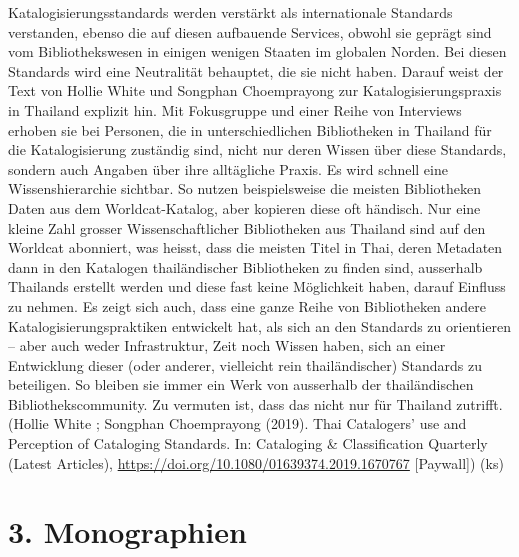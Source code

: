 \documentclass[a4paper,
fontsize=11pt,
oneside,
numbers=noperiodatend,
parskip=half-,
bibliography=totoc,
final
]{scrartcl}
\begin{document}
Katalogisierungsstandards werden verstärkt als internationale Standards
verstanden, ebenso die auf diesen aufbauende Services, obwohl sie
geprägt sind vom Bibliothekswesen in einigen wenigen Staaten im globalen
Norden. Bei diesen Standards wird eine Neutralität behauptet, die sie
nicht haben. Darauf weist der Text von Hollie White und Songphan
Choemprayong zur Katalogisierungspraxis in Thailand explizit hin. Mit
Fokusgruppe und einer Reihe von Interviews erhoben sie bei Personen, die
in unterschiedlichen Bibliotheken in Thailand für die Katalogisierung
zuständig sind, nicht nur deren Wissen über diese Standards, sondern
auch Angaben über ihre alltägliche Praxis. Es wird schnell eine
Wissenshierarchie sichtbar. So nutzen beispielsweise die meisten
Bibliotheken Daten aus dem Worldcat-Katalog, aber kopieren diese oft
händisch. Nur eine kleine Zahl grosser Wissenschaftlicher Bibliotheken
aus Thailand sind auf den Worldcat abonniert, was heisst, dass die
meisten Titel in Thai, deren Metadaten dann in den Katalogen
thailändischer Bibliotheken zu finden sind, ausserhalb Thailands
erstellt werden und diese fast keine Möglichkeit haben, darauf Einfluss
zu nehmen. Es zeigt sich auch, dass eine ganze Reihe von Bibliotheken
andere Katalogisierungspraktiken entwickelt hat, als sich an den
Standards zu orientieren -- aber auch weder Infrastruktur, Zeit noch
Wissen haben, sich an einer Entwicklung dieser (oder anderer, vielleicht
rein thailändischer) Standards zu beteiligen. So bleiben sie immer ein
Werk von ausserhalb der thailändischen Bibliothekscommunity. Zu vermuten
ist, dass das nicht nur für Thailand zutrifft. (Hollie White ; Songphan
Choemprayong (2019). Thai Catalogers' use and Perception of Cataloging
Standards. In: Cataloging \& Classification Quarterly (Latest Articles),
\url{https://doi.org/10.1080/01639374.2019.1670767} {[}Paywall{]}) (ks)

\hypertarget{monographien}{%
\section{3. Monographien}\label{monographien}}
\end{document}
